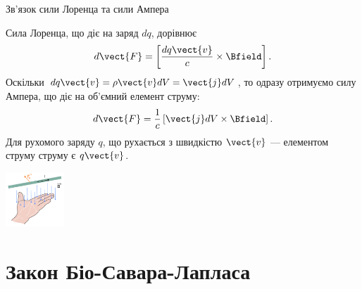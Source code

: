 \documentclass{beamer}
\begin{document}
\begin{frame}{Зв'язок сили Лоренца та сили Ампера}{}
	\begin{block}{}
		Сила Лоренца, що діє на заряд $dq$, дорівнює
		\begin{equation*}
			d\vect{F} = \left[\frac{dq \vect{v}}{c}\times\Bfield\right].
		\end{equation*}
		Оскільки $dq \vect{v} = \rho \vect{v} dV = \vect{j} dV$, то одразу отримуємо силу Ампера, що діє на об'ємний елемент струму:
		\begin{equation*}
			d\vect{F} = \frac1c \left[ \vect{j}dV \times \Bfield\right].
		\end{equation*}
		Для рухомого заряду $q$, що рухається з швидкістю $\vect{v}$ --- \alert{елементом струму струму є $q\vect{v}$}.
	\end{block}
\begin{center}
\includegraphics[width=2.2cm]{LeftHandRule}
\end{center}
\end{frame}





\section{Закон Біо-Савара-Лапласа}
\end{document}
